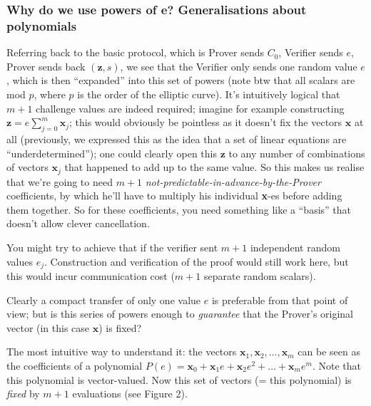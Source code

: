 \documentclass[10pt,a4paper]{article}
\begin{document}
\hypertarget{why-do-we-use-powers-of-e-generalisations-about-polynomials}{%
\subsubsection[Why do we use powers of e? Generalisations about
polynomials]{\texorpdfstring{\protect\hypertarget{anchor-31}{}{}Why do
we use powers of e? Generalisations about
polynomials}{Why do we use powers of e? Generalisations about polynomials}}\label{why-do-we-use-powers-of-e-generalisations-about-polynomials}}

Referring back to the basic protocol, which is Prover sends $C_0$, Verifier
sends $e$, Prover sends back $(\mathbf{z}, s)$, we see that the Verifier only sends one
random value $e$, which is then ``expanded'' into this set of powers (note
btw that all scalars are mod $p$, where $p$ is the order of the elliptic
curve). It's intuitively logical that $m+1$ challenge values are indeed
required; imagine for example constructing $\mathbf{z} = e\sum_{j=0}^{m} \textbf{x}_j$; this would obviously be
pointless as it doesn't fix the vectors $\mathbf{x}$ at all (previously, we expressed
this as the idea that a set of linear equations are
``underdetermined''); one could clearly open this $\mathbf{z}$ to any
number of combinations of vectors $\mathbf{x}_j$ that happened to add up to
the same value. So this makes us realise that we're going to need
$m+1$ \emph{not-predictable-in-advance-by-the-Prover} coefficients, by which
he'll have to multiply his individual \textbf{x}-es before adding them
together. So for these coefficients, you need something like a ``basis''
that doesn't allow clever cancellation.

You might try to achieve that if the verifier sent $m+1$ independent random
values $e_j$. Construction and verification of the proof would still work
here, but this would incur communication cost ($m+1$ separate random
scalars).

Clearly a compact transfer of only one value $e$ is preferable from that
point of view; but is this series of powers enough to
\emph{guarantee} that the Prover's original vector (in this case
$\mathbf{x}$) is fixed?

The most intuitive way to understand it: the vectors $\mathbf{x}_1, \mathbf{x}_2, \ldots, \mathbf{x}_m$ can be seen as the
coefficients of a polynomial $P(e) = \mathbf{x}_0 + \mathbf{x}_1e + \mathbf{x}_2e^2 + \ldots + \mathbf{x}_me^m$. Note that this polynomial is
vector-valued. Now this set of vectors (= this polynomial) is
\emph{fixed} by $m+1$ evaluations (see Figure 2).
\end{document}

